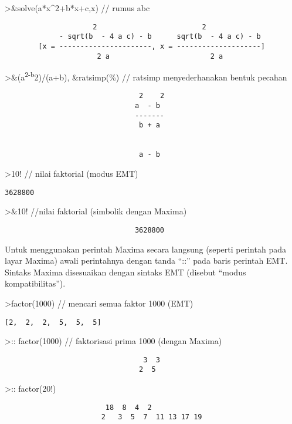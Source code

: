 \documentclass[
]{book}
\begin{document}
\textgreater\&solve(a*x\^{}2+b*x+c,x) // rumus abc

\begin{verbatim}
                     2                         2
             - sqrt(b  - 4 a c) - b      sqrt(b  - 4 a c) - b
        [x = ----------------------, x = --------------------]
                      2 a                        2 a
\end{verbatim}

\textgreater\&(a\textsuperscript{2-b}2)/(a+b), \&ratsimp(\%) // ratsimp menyederhanakan bentuk pecahan

\begin{verbatim}
                                2    2
                               a  - b
                               -------
                                b + a


                                a - b
\end{verbatim}

\textgreater10! // nilai faktorial (modus EMT)

\begin{verbatim}
3628800
\end{verbatim}

\textgreater\&10! //nilai faktorial (simbolik dengan Maxima)

\begin{verbatim}
                               3628800
\end{verbatim}

Untuk menggunakan perintah Maxima secara langsung (seperti perintah pada layar Maxima) awali perintahnya dengan tanda ``::'' pada baris perintah EMT. Sintaks Maxima disesuaikan dengan sintaks EMT (disebut ``modus kompatibilitas'').

\textgreater factor(1000) // mencari semua faktor 1000 (EMT)

\begin{verbatim}
[2,  2,  2,  5,  5,  5]
\end{verbatim}

\textgreater:: factor(1000) // faktorisasi prima 1000 (dengan Maxima)

\begin{verbatim}
                                 3  3
                                2  5
\end{verbatim}

\textgreater:: factor(20!)

\begin{verbatim}
                        18  8  4  2
                       2   3  5  7  11 13 17 19
\end{verbatim}
\end{document}
